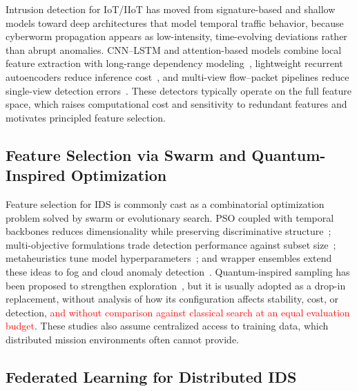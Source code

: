 \documentclass[conference]{IEEEtran}
\begin{document}
Intrusion detection for IoT/IIoT has moved from signature-based and
shallow models toward deep architectures that model temporal traffic
behavior, because cyberworm propagation appears as low-intensity,
time-evolving deviations rather than abrupt anomalies. CNN--LSTM and
attention-based models combine local feature extraction with
long-range dependency modeling~\cite{phalaagaehybrid,yuadaptive},
lightweight recurrent autoencoders reduce inference
cost~\cite{yupgtad}, and multi-view flow--packet pipelines reduce
single-view detection errors~\cite{sudyanaflow}. These detectors
typically operate on the full feature space, which raises
computational cost and sensitivity to redundant features and
motivates principled feature selection.

\subsection{Feature Selection via Swarm and Quantum-Inspired Optimization}

Feature selection for IDS is commonly cast as a combinatorial
optimization problem solved by swarm or evolutionary search.
PSO coupled with temporal backbones reduces dimensionality while
preserving discriminative structure~\cite{donkoloptimization};
multi-objective formulations trade detection performance against
subset size~\cite{sezginmulti,raeisientropy}; metaheuristics tune
model hyperparameters~\cite{kishoreimproved}; and wrapper ensembles
extend these ideas to fog and cloud anomaly
detection~\cite{yaseenefficient,bilalevaluation,maryenhancing,shrivashybrid}.
Quantum-inspired sampling has been proposed to strengthen
exploration~\cite{vivekquantum}, but it is usually adopted as a
drop-in replacement, without analysis of how its configuration affects
stability, cost, or detection, \textcolor{red}{and without
comparison against classical search at an equal evaluation budget}.
These studies also assume centralized access to training data, which
distributed mission environments often cannot provide.

\subsection{Federated Learning for Distributed IDS}
\end{document}
